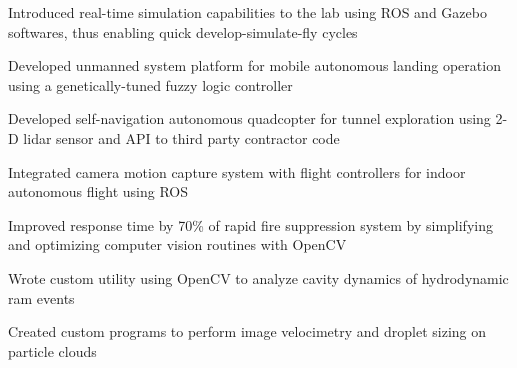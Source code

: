 \documentclass[letterpaper]{deedy-resume}
\newcommand{\experiencespace}{\vspace{2em}}
\begin{document}
\begin{minipage}[t]{0.66\textwidth}
    \begin{compactitem}
        \item Introduced real-time simulation capabilities to the lab using ROS and Gazebo softwares, thus
            enabling quick develop-simulate-fly cycles
        \item Developed unmanned system platform for mobile autonomous landing operation using a
            genetically-tuned fuzzy logic controller
        \item Developed self-navigation autonomous quadcopter for tunnel exploration using 2-D lidar sensor
            and API to third party contractor code
        \item Integrated camera motion capture system with flight controllers for indoor autonomous flight
            using ROS
    \end{compactitem}
    \experiencespace
    
    \begin{compactitem}
        \item Improved response time by 70\% of rapid fire suppression system by simplifying and optimizing
            computer vision routines with OpenCV
        \item Wrote custom utility using OpenCV to analyze cavity dynamics of hydrodynamic ram events
        \item Created custom programs to perform image velocimetry and droplet sizing on particle clouds
    \end{compactitem}
\end{minipage} %
\end{document}

